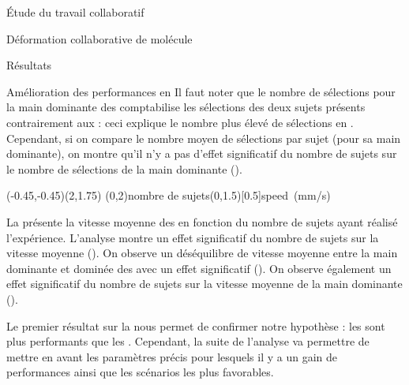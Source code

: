 \documentclass[myfrancais]{mythesis}
\begin{document}
\begin{mypart}{Étude du travail collaboratif}
\begin{mychapter}{Déformation collaborative de molécule}
\begin{mysection}{Résultats}
\begin{mysubsection}{Amélioration des performances en }
					Il faut noter que le nombre de sélections pour la main dominante des  comptabilise les sélections des deux sujets présents contrairement aux  : ceci explique le nombre plus élevé de sélections en .
					Cependant, si on compare le nombre moyen de sélections par sujet (pour sa main dominante), on montre qu'il n'y a pas d'effet significatif du nombre de sujets  sur le nombre de sélections de la main dominante  ().

					\begin{myfigure}
						\begin{myps}(-0.45,-0.45)(2,1.75)
							\myaxes(0,2){nombre de sujets}(0,1.5)[0.5]{speed~(mm/s)}
						\end{myps}
					\end{myfigure}

					La  présente la vitesse moyenne  des  en fonction du nombre de sujets  ayant réalisé l'expérience.
					L'analyse montre un effet significatif du nombre de sujets  sur la vitesse moyenne  ().
					On observe un déséquilibre de vitesse moyenne entre la main dominante et dominée des  avec un effet significatif ().
					On observe également un effet significatif du nombre de sujets  sur la vitesse moyenne  de la main dominante ().

					Le premier résultat sur la  nous permet de confirmer notre hypothèse  : les  sont plus performants que les .
					Cependant, la suite de l'analyse va permettre de mettre en avant les paramètres précis pour lesquels il y a un gain de performances ainsi que les scénarios les plus favorables.


\end{mysubsection}
\end{mysection}
\end{mychapter}
\end{mypart}
\end{document}
